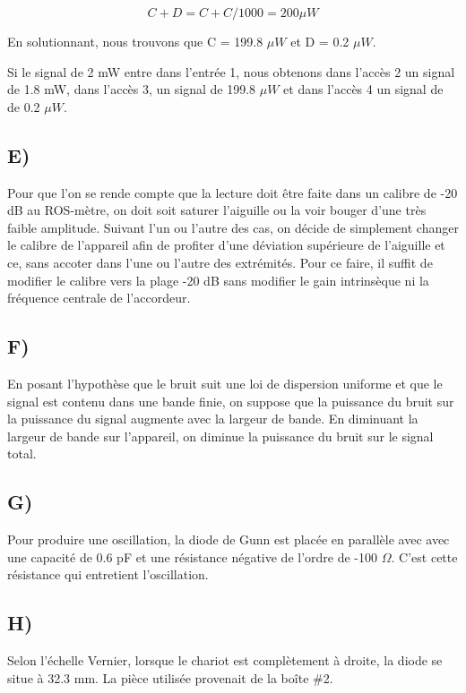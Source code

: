 \begin{equation}
	C+D = C+C/1000 = 200\mu W
\end{equation}

En solutionnant, nous trouvons que C = 199.8 $\mu W$ et D = 0.2 $\mu W$.

Si le signal de 2 mW entre dans l'entrée 1, nous obtenons dans l'accès 2 un signal de 1.8 mW, dans l'accès 3, un signal de 199.8 $\mu W$ et dans l'accès 4 un signal de de 0.2 $\mu W$.

\subsection{E)}
Pour que l'on se rende compte que la lecture doit être faite dans un calibre de -20 dB au ROS-mètre, on doit soit saturer l'aiguille ou la voir bouger d'une très faible amplitude. Suivant l'un ou l'autre des cas, on décide de simplement changer le calibre de l'appareil afin de profiter d'une déviation supérieure de l'aiguille et ce, sans accoter dans l'une ou l'autre des extrémités. Pour ce faire, il suffit de modifier le calibre vers la plage -20 dB sans modifier le gain intrinsèque ni la fréquence centrale de l'accordeur. 

\subsection{F)}
En posant l'hypothèse que le bruit suit une loi de dispersion uniforme et que le signal est contenu dans une bande finie, on suppose que la puissance du bruit sur la puissance du signal augmente avec la largeur de bande. En diminuant la largeur de bande sur l'appareil, on diminue la puissance du bruit sur le signal total. 

\subsection{G)}
Pour produire une oscillation, la diode de Gunn est placée en parallèle avec avec une capacité de 0.6 pF et une résistance négative de l'ordre de -100 $\Omega$. C'est cette résistance qui entretient l'oscillation.

\subsection{H)}
Selon l'échelle Vernier, lorsque le chariot est complètement à droite, la diode se situe à 32.3 mm. La pièce utilisée provenait de la boîte \#2.

